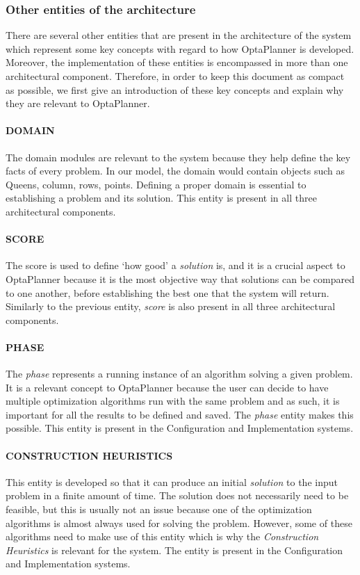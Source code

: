 \subsubsection{Other entities of the architecture}
\label{sec:arch_entities}
There are several other entities that are present in the architecture of the system which represent some key concepts with regard to how OptaPlanner is developed. Moreover, the implementation of these entities is encompassed in more than one architectural component. Therefore, in order to keep this document as compact as possible, we first give an introduction of these key concepts and explain why they are relevant to OptaPlanner.
\paragraph{{\scriptsize DOMAIN}}
The domain modules are relevant to the system because they help define the key facts of every problem. In our model, the domain would contain objects such as Queens, column, rows, points. Defining a proper domain is essential to establishing a problem and its solution. This entity is present in all three architectural components.
\paragraph{{\scriptsize SCORE}}
The score is used to define `how good’ a \textit{solution} is, and it is a crucial aspect to OptaPlanner because it is the most objective way that solutions can be compared to one another, before establishing the best one that the system will return. Similarly to the previous entity, \textit{score} is also present in all three architectural components.
\paragraph{{\scriptsize PHASE}}
The \textit{phase} represents a running instance of an algorithm solving a given problem. It is a relevant concept to OptaPlanner because the user can decide to have multiple optimization algorithms run with the same problem and as such, it is important for all the results to be defined and saved. The \textit{phase} entity makes this possible. This entity is present in the Configuration and Implementation systems.
\paragraph{{\scriptsize CONSTRUCTION HEURISTICS}}
This entity is developed so that it can produce an initial \textit{solution} to the input problem in a finite amount of time. The solution does not necessarily need to be feasible, but this is usually not an issue because one of the optimization algorithms is almost always used for solving the problem. However, some of these algorithms need to make use of this entity which is why the \textit{Construction Heuristics} is relevant for the system. The entity is present in the Configuration and Implementation systems.
